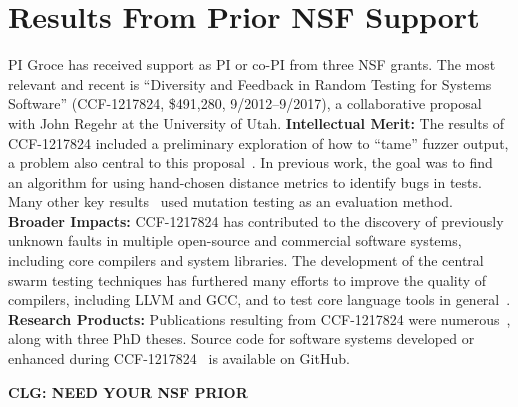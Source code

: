 \section{Results From Prior NSF Support}

PI Groce has received support as PI or co-PI from three NSF grants.
The most relevant and recent is ``Diversity and Feedback in Random
Testing for Systems Software'' (CCF-1217824,
\$491,280, 9/2012--9/2017), a collaborative proposal with John Regehr at the
University of Utah.
{\bf Intellectual Merit:} 
The results of CCF-1217824 included a preliminary exploration of how to
``tame'' fuzzer output, a problem also central to this proposal~\cite{PLDI13}.  In previous work, the goal was to find an algorithm
for using hand-chosen distance metrics to identify bugs in tests.
Many other key results~\cite{DirectedSwarm,issta14,helphelp,Onward14} used mutation testing as an
evaluation method.
{\bf Broader Impacts:} 
CCF-1217824 has contributed to the discovery of previously
unknown faults in multiple open-source and commercial software
systems, including core compilers and system libraries.  The
development of the central swarm testing techniques
has furthered many efforts to improve
the quality of compilers, including LLVM and GCC, and to test core language
tools in
general~\cite{ZhendongPLDI14,beginnerluck,dewey2015fuzzing,le2015randomized}. 
{\bf Research Products:}
Publications resulting from CCF-1217824 were numerous~\cite{Onward14,PLDI13,issta14,icst2014,helphelp,DirectedSwarm,stvrcausereduce,tstlsttt,ISSTA15,AlipourETAL16TestReduction,tstlsttt,NFM15},
along with three PhD theses.  Source code for software systems
developed or enhanced during CCF-1217824~\cite{swarmtools,TSTL}  is
available on GitHub.

{\bf CLG:  NEED YOUR NSF PRIOR}